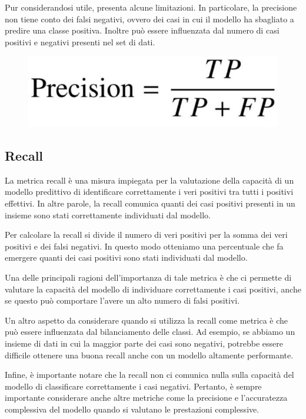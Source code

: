 Pur considerandosi utile, presenta alcune limitazioni. In particolare, la precisione non tiene conto dei falsi negativi, ovvero dei casi in cui il modello ha sbagliato a predire una classe positiva. Inoltre può essere influenzata dal numero di casi positivi e negativi presenti nel set di dati.

\begin{figure}
    \begin{center}    
        \includegraphics[width=0.5\linewidth]{images/image48.jpeg}
    \end{center}
\end{figure}

\subsection{Recall}
La metrica recall è una misura impiegata per la valutazione della capacità di un modello predittivo di identificare correttamente i veri positivi tra tutti i positivi effettivi. In altre parole, la recall comunica quanti dei casi positivi presenti in un insieme sono stati correttamente individuati dal modello.

Per calcolare la recall si divide il numero di veri positivi per la somma dei veri positivi e dei falsi negativi. In questo modo otteniamo una percentuale che fa emergere quanti dei casi positivi sono stati individuati dal modello.

Una delle principali ragioni dell’importanza di tale metrica è che ci permette di valutare la capacità del modello di individuare correttamente i casi positivi, anche se questo può comportare l’avere un alto numero di falsi positivi.

Un altro aspetto da considerare quando si utilizza la recall come metrica è che può essere influenzata dal bilanciamento delle classi. Ad esempio, se abbiamo un insieme di dati in cui la maggior parte dei casi sono negativi, potrebbe essere difficile ottenere una buona recall anche con un modello altamente performante.

Infine, è importante notare che la recall non ci comunica nulla sulla capacità del modello di classificare correttamente i casi negativi. Pertanto, è sempre importante considerare anche altre metriche come la precisione e l'accuratezza complessiva del modello quando si valutano le prestazioni complessive.


